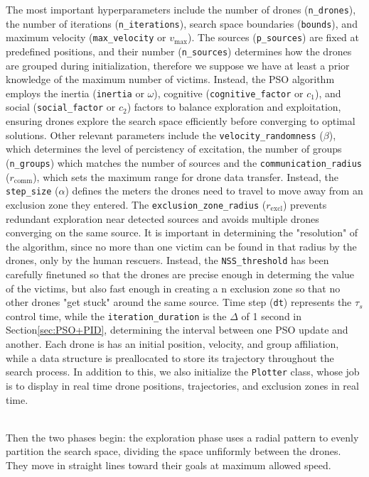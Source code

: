 The most important hyperparameters 
include the number of drones (\texttt{n\_drones}), 
the number of iterations (\texttt{n\_iterations}), 
search space boundaries (\texttt{bounds}), 
and maximum velocity (\texttt{max\_velocity} or $v_\text{max}$). 
The sources (\texttt{p\_sources}) are fixed at predefined positions, 
and their number (\texttt{n\_sources}) determines how the drones are grouped 
during initialization, therefore 
we suppose we have at least a prior knowledge 
of the maximum number of victims. Instead, the PSO algorithm employs 
the inertia (\texttt{inertia} or $\omega$), cognitive (\texttt{cognitive\_factor} or $c_1$), 
and social (\texttt{social\_factor} or $c_2$) factors to 
balance exploration and exploitation, 
ensuring drones explore the search space efficiently
before converging to optimal solutions.
Other relevant parameters include the \texttt{velocity\_randomness} ($\beta$), 
which determines the level of percistency of excitation, the number of groups 
(\texttt{n\_groups}) which matches the number of sources and
the \texttt{communication\_radius} ($r_\text{comm}$), which sets the maximum range for drone 
data transfer.
Instead, the \texttt{step\_size} ($\alpha$) defines the meters the drones need to 
travel to move away from an exclusion zone they entered. 
The \texttt{exclusion\_zone\_radius} ($r_\text{excl}$) prevents redundant 
exploration near detected sources and avoids multiple drones 
converging on the same source. It is important in determining
the "resolution" of the algorithm, since no more than one victim can be found in that
radius by the drones, only by the human rescuers.
Instead, the  \texttt{NSS\_threshold} has been carefully finetuned
so that the drones are precise enough in determing the value of the victims,
but also fast enough in creating a n exclusion zone so that no other drones
"get stuck" around the same source.
Time step (\texttt{dt}) represents 
the $\tau_s$ control time, while the \texttt{iteration\_duration} 
is the $\Delta$ of 1 second in Section\ref{sec:PSO+PID}, determining the interval between one PSO 
update and another.
Each drone is has an initial position, velocity, and group affiliation, 
while a data structure is preallocated to store its trajectory 
throughout the search process.
In addition to this, we also initialize the \texttt{Plotter} class, 
whose job is to display in real time drone positions, trajectories, 
and exclusion zones in real time.

\noindent\\
Then the two phases begin:
the exploration phase uses a radial pattern to evenly partition 
the search space, dividing the space unfiformly 
between the drones. 
They move in straight lines toward their goals at maximum 
allowed speed. 

